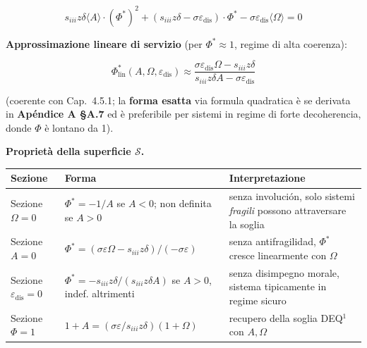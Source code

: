 \[
s_{iii} z \delta \langle A\rangle \cdot (\Phi^*)^2 + (s_{iii} z \delta - \sigma \varepsilon_{\text{dis}}) \cdot \Phi^* - \sigma \varepsilon_{\text{dis}} \langle\Omega\rangle = 0
\]

\Hypoth{} \textbf{Approssimazione lineare di servizio} (per
\(\Phi^* \approx 1\), regime di alta coerenza):

\[
\Phi^*_{\text{lin}}(A, \Omega, \varepsilon_{\text{dis}}) \approx \frac{\sigma \varepsilon_{\text{dis}} \Omega - s_{iii} z \delta}{s_{iii} z \delta A - \sigma \varepsilon_{\text{dis}}}
\]

(coerente con Cap.~4.5.1; la \textbf{forma esatta} via formula
quadratica è se derivata in \textbf{Apéndice A \S{}A.7} ed è preferibile per
sistemi in regime di forte decoherencia, donde \(\Phi\) è lontano da 1).

\Proved{} \textbf{Proprietà della superficie \(\mathcal{S}\).}

{\def\LTcaptype{none} %
{\small\begin{longtable}[]{@{}
  >{\raggedright\arraybackslash}p{}
  >{\raggedright\arraybackslash}p{}
  >{\raggedright\arraybackslash}p{}@{}}
\toprule\noalign{}
\begin{minipage}[b]{\linewidth}\raggedright
Sezione
\end{minipage} & \begin{minipage}[b]{\linewidth}\raggedright
Forma
\end{minipage} & \begin{minipage}[b]{\linewidth}\raggedright
Interpretazione
\end{minipage} \\
\midrule\noalign{}
\endhead
\bottomrule\noalign{}
\endlastfoot
Sezione \(\Omega = 0\) & \(\Phi^* = -1/A\) se \(A < 0\); non definita se
\(A > 0\) & senza involución, solo sistemi \emph{fragili} possono
attraversare la soglia \\
Sezione \(A = 0\) &
\(\Phi^* = (\sigma\varepsilon\Omega - s_{iii}z\delta) / (-\sigma\varepsilon)\)
& senza antifragilidad, \(\Phi^*\) cresce linearmente con \(\Omega\) \\
Sezione \(\varepsilon_{\text{dis}} = 0\) &
\(\Phi^* = -s_{iii}z\delta / (s_{iii}z\delta A)\) se \(A > 0\), indef.
altrimenti & senza disimpegno morale, sistema tipicamente in regime
sicuro \\
Sezione \(\Phi = 1\) &
\(1 + A = (\sigma\varepsilon/s_{iii}z\delta)(1 + \Omega)\) & recupero
della soglia DEQ$^1$ con \(A, \Omega\) \\
\end{longtable}}
}

